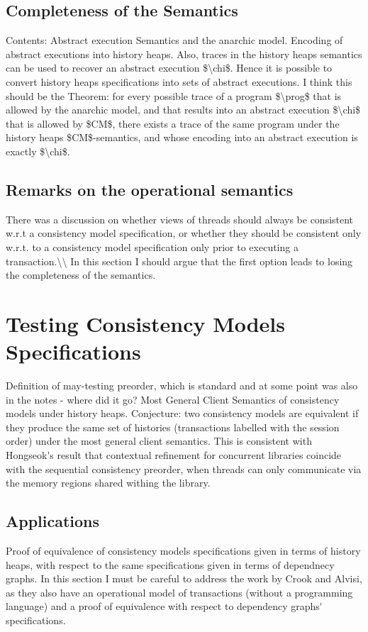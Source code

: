 \documentclass[a4paper,UKenglish]{article}%
\theoremstyle{plain}
\begin{document}
\subsection{Completeness of the Semantics} 
\ac{Contents: Abstract execution Semantics and the anarchic model. 
Encoding of abstract executions into history heaps. Also, 
traces in the history heaps semantics can be used to recover 
an abstract execution $\chi$. Hence it is possible to convert history heaps 
specifications into sets of abstract executions.
I think this should be the Theorem: for every possible trace of a program $\prog$ that is allowed by the anarchic 
model, and that results into an abstract execution $\chi$ that is allowed by $CM$, there 
exists a trace of the same program under the history heaps $CM$-semantics, 
and whose encoding into an abstract execution is exactly $\chi$.}
\subsection{Remarks on the operational semantics}
\ac{There was a discussion on whether views of threads should always be consistent w.r.t a 
consistency model specification, or whether they should be consistent only w.r.t. to 
a consistency model specification only prior to executing a transaction.\\ 
In this section I should argue that the first option leads to losing the completeness of the 
semantics.}


\section{Testing Consistency Models Specifications}
\ac{Definition of may-testing preorder, which is standard and at some point 
was also in the notes - where did it go? Most General Client Semantics of consistency 
models under history heaps. Conjecture: two consistency models are equivalent if they 
produce the same set of histories (transactions labelled with the session order) under 
the most general client semantics. This is consistent with Hongseok's result that contextual 
refinement for concurrent libraries coincide with 
the sequential consistency preorder, when threads can only communicate via the memory regions 
shared withing the library.}

\subsection{Applications}
\ac{Proof of equivalence of consistency models specifications given in terms of history heaps, 
with respect to the same specifications given in terms of dependnecy graphs. In this section 
I must be careful to address the work by Crook and Alvisi, as they also have an operational model 
of transactions (without a programming language) and a proof of equivalence with respect to 
dependency graphs' specifications.}
\end{document}
